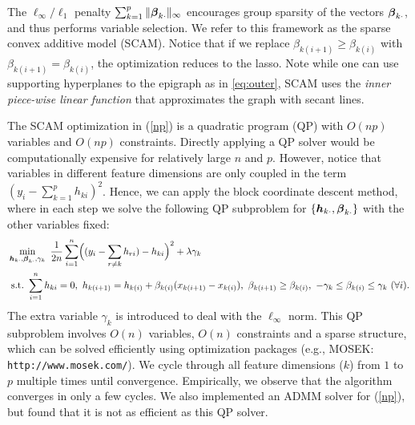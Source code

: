 The $\ell_\infty/\ell_1$ penalty
$\sum_{k=1}^{p}\|\boldsymbol{\beta}_{k\cdot}\|_{\infty}$ encourages group
sparsity of the vectors $\boldsymbol{\beta}_{k\cdot}$, and thus performs
variable selection.  We refer to this framework as the sparse convex
additive model (SCAM). Notice that if we replace $\beta_{k(i+1)} \geq
\beta_{k(i)}$ with $\beta_{k(i+1)}=\beta_{k(i)}$, the optimization
reduces to the lasso.  Note while one can use
supporting hyperplanes to the epigraph as in \eqref{eq:outer}, 
SCAM uses the \emph{inner  piece-wise linear function}
that approximates the graph with secant lines.



The SCAM optimization in (\ref{np}) is a quadratic program (QP) with $O(np)$ variables and $O(np)$ constraints. 
Directly applying a QP solver would be computationally expensive for relatively large $n$ and $p$. However, notice that variables
in different feature dimensions are only coupled in the term $(y_{i}-\sum_{k=1}^{p}h_{ki})^{2}$. Hence, we can apply the block coordinate descent method,
where in each step we solve the following QP subproblem for
$\{\boldsymbol{h}_{k\cdot},\boldsymbol{\beta}_{k\cdot}\}$ with the other variables fixed:
\begin{equation}\begin{split}\nonumber
       &\min_{\bds{h}_{k\cdot},\bds{\beta}_{k\cdot},\gamma_{k}} \ \frac{1}{2n}\sum_{i=1}^{n}\Bigl((y_{i}-\sum_{r\neq{k}}h_{ri})-h_{ki}\Bigr)^{2} + \lambda\gamma_{k} \\
        &\ \textrm{s.t.} \ \sum_{i=1}^{n}h_{ki}=0, \ h_{k(i+1)} = h_{k(i)} + \beta_{k(i)}(x_{k(i+1)}-x_{k(i)}), \ \beta_{k(i+1)} \geq \beta_{k(i)}, \ -\gamma_{k}\leq\beta_{k(i)}\leq\gamma_{k} \ (\forall i).
\end{split}\end{equation}
The extra variable $\gamma_{k}$ is introduced to deal with the $\ell_{\infty}$ norm. This QP subproblem involves $O(n)$ variables, $O(n)$ constraints and a sparse structure, 
which can be solved efficiently using optimization packages (e.g., MOSEK: \verb+http://www.mosek.com/+).  We cycle through all feature dimensions ($k$) from $1$ to $p$ multiple times until convergence.
Empirically, we observe that the algorithm converges in only a few cycles. We also implemented an ADMM solver for (\ref{np}), but found that it is not as efficient as this QP solver.

